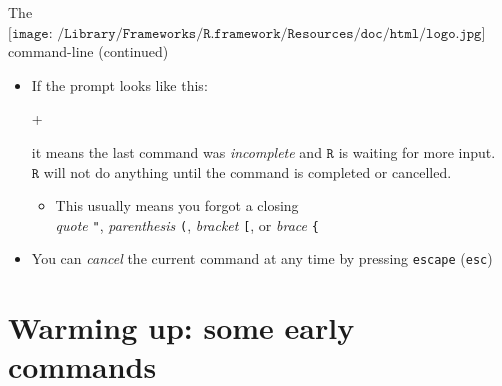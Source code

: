 \documentclass[
  11pt,
  ignorenonframetext,
]{beamer}
\newenvironment{Shaded}{\begin{snugshade}}{\end{snugshade}}
\newcommand{\AlertTok}[1]{\textcolor[rgb]{0.94,0.16,0.16}{#1}}
\newcommand{\NormalTok}[1]{#1}
\newcommand{\StringTok}[1]{\textcolor[rgb]{0.31,0.60,0.02}{#1}}
\providecommand{\tightlist}{%
  \setlength{\itemsep}{0pt}\setlength{\parskip}{0pt}}
\begin{document}
\begin{frame}[fragile]{The
\(\texttt{[image: /Library/Frameworks/R.framework/Resources/doc/html/logo.jpg]}\)
command-line (continued)}
\protect\hypertarget{the-includegraphicsheight1emlibraryframeworksr.frameworkresourcesdochtmllogo.jpg-command-line-continued}{}
\begin{itemize}
\item
  If the prompt looks like this:

\begin{Shaded}
\begin{Highlighting}[]
\NormalTok{+}
\end{Highlighting}
\end{Shaded}

  it means the last command was \emph{incomplete} and \(\texttt{R}\) is
  waiting for more input.\\
  \(\texttt{R}\) will not do anything until the command is completed or
  cancelled.

  \begin{itemize}
  \tightlist
  \item
    This usually means you forgot a closing\\
    \emph{quote} \AlertTok{\texttt{"}}, \emph{parenthesis}
    \AlertTok{\texttt{(}}, \emph{bracket} \AlertTok{\texttt{[}}, or
    \emph{brace} \AlertTok{\texttt{\{}}
  \end{itemize}
\item
  \StringTok{You can \textit{cancel} the current command at any time by pressing \texttt{escape}}
  (\AlertTok{\texttt{esc}})
\end{itemize}
\end{frame}

\hypertarget{warming-up-some-early-commands}{%
\section{Warming up: some early
commands}\label{warming-up-some-early-commands}}
\end{document}
